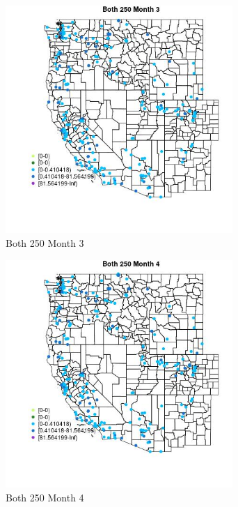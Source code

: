 \begin{figure} 
\centering  
\includegraphics[width=0.77\textwidth]{Code_Outputs/Report_ML_input_PM25_Step4_part_e_de_duplicated_aveswNAs_MapObsMo3Both_250.jpg} 
\caption{\label{fig:Report_ML_input_PM25_Step4_part_e_de_duplicated_aveswNAsMapObsMo3Both_250}Both 250 Month 3} 
\end{figure} 
 

\begin{figure} 
\centering  
\includegraphics[width=0.77\textwidth]{Code_Outputs/Report_ML_input_PM25_Step4_part_e_de_duplicated_aveswNAs_MapObsMo4Both_250.jpg} 
\caption{\label{fig:Report_ML_input_PM25_Step4_part_e_de_duplicated_aveswNAsMapObsMo4Both_250}Both 250 Month 4} 
\end{figure} 
 

